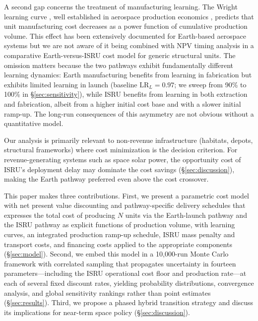 \documentclass[preprint,12pt]{elsarticle}
\begin{document}
A second gap concerns the treatment of manufacturing learning. The Wright learning curve \cite{wright1936}, well established in aerospace production economics \cite{wertz2011}, predicts that unit manufacturing cost decreases as a power function of cumulative production volume. This effect has been extensively documented for Earth-based aerospace systems \cite{argote1990,nagy2013} but we are not aware of it being combined with NPV timing analysis in a comparative Earth-versus-ISRU cost model for generic structural units. The omission matters because the two pathways exhibit fundamentally different learning dynamics: Earth manufacturing benefits from learning in fabrication but exhibits limited learning in launch (baseline $\mathrm{LR}_L = 0.97$; we sweep from 90\% to 100\% in \S\ref{sec:sensitivity}), while ISRU benefits from learning in both extraction and fabrication, albeit from a higher initial cost base and with a slower initial ramp-up. The long-run consequences of this asymmetry are not obvious without a quantitative model.

Our analysis is primarily relevant to non-revenue infrastructure (habitats, depots, structural frameworks) where cost minimization is the decision criterion. For revenue-generating systems such as space solar power, the opportunity cost of ISRU's deployment delay may dominate the cost savings (\S\ref{sec:discussion}), making the Earth pathway preferred even above the cost crossover.

This paper makes three contributions. First, we present a parametric cost model with net present value discounting and pathway-specific delivery schedules that expresses the total cost of producing $N$ units via the Earth-launch pathway and the ISRU pathway as explicit functions of production volume, with learning curves, an integrated production ramp-up schedule, ISRU mass penalty and transport costs, and financing costs applied to the appropriate components (\S\ref{sec:model}). Second, we embed this model in a 10{,}000-run Monte Carlo framework with correlated sampling that propagates uncertainty in fourteen parameters---including the ISRU operational cost floor and production rate---at each of several fixed discount rates, yielding probability distributions, convergence analysis, and global sensitivity rankings rather than point estimates (\S\ref{sec:results}). Third, we propose a phased hybrid transition strategy and discuss its implications for near-term space policy (\S\ref{sec:discussion}).

\end{document}
